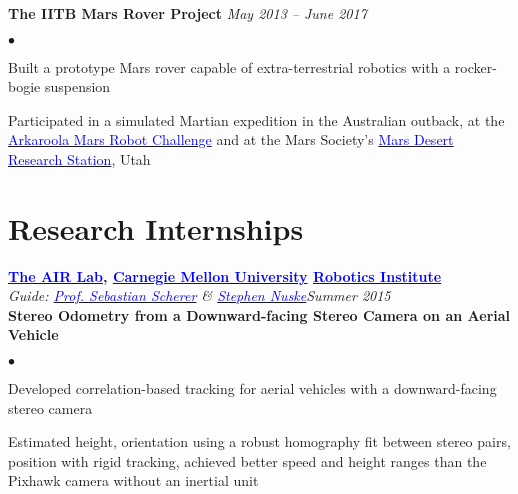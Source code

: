 \documentclass[margin,line]{res}
\newenvironment{list2}{
  \begin{list}{$\bullet$}{%
      \setlength{\itemsep}{0in}
      \setlength{\parsep}{0in} \setlength{\parskip}{0in}
      \setlength{\topsep}{0in} \setlength{\partopsep}{0in} 
      \setlength{\leftmargin}{0.18in}}}{\end{list}}
\begin{document}
\begin{resume}
\vspace*{-0.13in}

{\bf The IITB Mars Rover Project}
\hfill {\it May 2013 -- June 2017} \\
\vspace*{-.13in}
\begin{list2}
\item Built a prototype Mars rover capable of extra-terrestrial robotics with a rocker-bogie suspension
\item Participated in a simulated Martian expedition in the Australian outback, at the \href{http://marssociety.org.au/article/arkaroola-mars-robot-challenge-spaceward-bound-expedition}{\textcolor{blue} {Arkaroola Mars Robot Challenge}} and at the Mars Society's \href{http://mdrs.marssociety.org/}{\textcolor{blue} {Mars Desert Research Station}}, Utah
\end{list2}


\section{\sc Research Internships} 

{\bf  \href{http://theairlab.org/}{\textcolor{blue}{The AIR Lab}}, \href{http://www.cmu.edu/}{\textcolor{blue}{Carnegie Mellon University}} \href{http://ri.cmu.edu/}{\textcolor{blue}{Robotics Institute}}} \\
{\em Guide: \href{http://www.ri.cmu.edu/person.html?person_id=1397}{\textcolor{blue}{Prof. Sebastian Scherer}} \& \href{http://www.ri.cmu.edu/person.html?person_id=2128}{\textcolor{blue} {Stephen Nuske}}}\hfill\textit{Summer 2015} \\
\vspace*{-.13in}
\textbf{Stereo Odometry from a Downward-facing Stereo Camera on an Aerial Vehicle} \\
\vspace*{-.01in}
\begin{list2}
\item Developed correlation-based tracking for aerial vehicles with a downward-facing stereo camera
\item Estimated height, orientation using a robust homography fit between stereo pairs, position with rigid tracking, achieved better speed and height ranges than the Pixhawk camera without an inertial unit
\end{list2}

\vspace*{-0.13in}


\end{resume}
\end{document}

